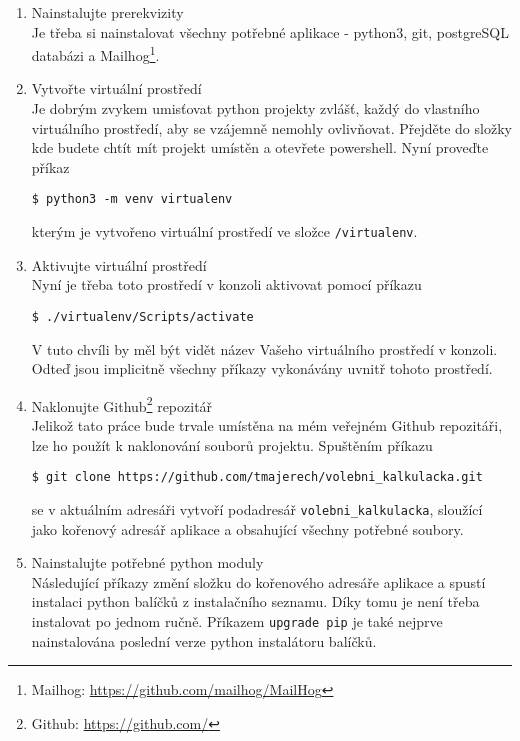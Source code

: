 \label{append:local}
\begin{enumerate}
    \item Nainstalujte prerekvizity\\
    Je třeba si nainstalovat všechny potřebné aplikace - python3, git, postgreSQL databázi a Mailhog\footnote{Mailhog: \url{https://github.com/mailhog/MailHog}}. 
    
    \item Vytvořte virtuální prostředí\\
    Je dobrým zvykem umisťovat python projekty zvlášť, každý do vlastního virtuálního prostředí, aby se vzájemně nemohly ovlivňovat. Přejděte do složky kde budete chtít mít projekt umístěn a otevřete powershell. Nyní proveďte příkaz
    
    \texttt{\$ python3 -m venv virtualenv}
    
    kterým je vytvořeno virtuální prostředí ve složce \texttt{/virtualenv}. 
    
    \item Aktivujte virtuální prostředí\\
    Nyní je třeba toto prostředí v konzoli aktivovat pomocí příkazu
    
    \texttt{\$ ./virtualenv/Scripts/activate}
    
    V tuto chvíli by měl být vidět název Vašeho virtuálního prostředí v konzoli. Odteď jsou implicitně všechny příkazy vykonávány uvnitř tohoto prostředí.
    
    \item Naklonujte Github\footnote{Github: \url{https://github.com/}} repozitář\\
    Jelikož tato práce bude trvale umístěna na mém veřejném Github repozitáři, lze ho použít k naklonování souborů projektu. Spuštěním příkazu 
    
    \texttt{\$ git clone https://github.com/tmajerech/volebni\_kalkulacka.git}
    
    se v aktuálním adresáři vytvoří podadresář \texttt{volebni\_kalkulacka}, sloužící jako kořenový adresář aplikace a obsahující všechny potřebné soubory.
    

    \item Nainstalujte potřebné python moduly\\
    Následující příkazy změní složku do kořenového adresáře aplikace a spustí instalaci python balíčků z instalačního seznamu. Díky tomu je není třeba instalovat po jednom ručně. Příkazem \texttt{upgrade pip} je také nejprve nainstalována poslední verze python instalátoru balíčků.


\end{enumerate}
